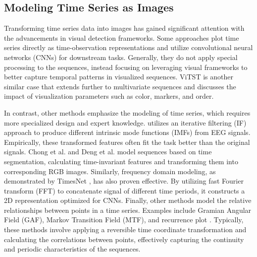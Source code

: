
\subsection{Modeling Time Series as Images}
Transforming time series data into images has gained significant attention with the advancements in visual detection frameworks. Some approaches \cite{sood2021visual,sangha2022automated,ao2023image, semenoglou2023image, maroor2024image} plot time series directly as time-observation representations and utilize convolutional neural networks (CNNs) for downstream tasks. Generally, they do not apply special processing to the sequences, instead focusing on leveraging visual frameworks to better capture temporal patterns in visualized sequences. ViTST \cite{li2024time} is another similar case that extends further to multivariate sequences and discusses the impact of visualization parameters such as color, markers, and order. 

In contrast, other methods emphasize the modeling of time series, which requires more specialized design and expert knowledge. \cite{tripathy2018use} utilizes an iterative filtering (IF) approach to produce different intrinsic mode functions (IMFs) from EEG signals. Empirically, these transformed features often fit the task better than the original signals. Chong et al. \cite{chong2011signal} and Deng et al. \cite{bs2023_1730} model sequences based on time segmentation, calculating time-invariant features and transforming them into corresponding RGB images. Similarly, frequency domain modeling, as demonstrated by TimesNet \cite{wu2023timesnet}, has also proven effective. By utilizing fast Fourier transform (FFT) to concatenate signal of different time periods, it constructs a 2D representation optimized for CNNs. Finally, other methods model the relative relationships between points in a time series. Examples include Gramian Angular Field (GAF), Markov Transition Field (MTF), and recurrence plot \cite{10.5555/2832747.2832798,hatami2018classification}. Typically, these methods involve applying a reversible time coordinate transformation and calculating the correlations between points, effectively capturing the continuity and periodic characteristics of the sequences.
